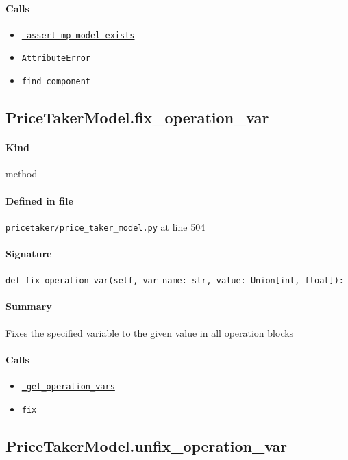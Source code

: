 \documentclass[11pt]{report}
\begin{document}
\paragraph{Calls}
\begin{itemize}[leftmargin=*]
  \item \hyperref[def:pricetaker-price_taker_model.py:PriceTakerModel._assert_mp_model_exists:L283]{\texttt{\_assert\_mp\_model\_exists}}
  \item \texttt{AttributeError}
  \item \texttt{find\_component}
\end{itemize}
\subsection{PriceTakerModel.fix\_operation\_var}
\label{def:pricetaker-price_taker_model.py:PriceTakerModel.fix_operation_var:L504}
\paragraph{Kind} method
\paragraph{Defined in file} \texttt{pricetaker/price\_taker\_model.py} at line 504
\paragraph{Signature} \texttt{def fix\_operation\_var(self, var\_name: str, value: Union[int, float]):}
\paragraph{Summary} Fixes the specified variable to the given value in all operation blocks
\paragraph{Calls}
\begin{itemize}[leftmargin=*]
  \item \hyperref[def:pricetaker-price_taker_model.py:PriceTakerModel._get_operation_vars:L482]{\texttt{\_get\_operation\_vars}}
  \item \texttt{fix}
\end{itemize}
\subsection{PriceTakerModel.unfix\_operation\_var}
\label{def:pricetaker-price_taker_model.py:PriceTakerModel.unfix_operation_var:L518}
\end{document}
